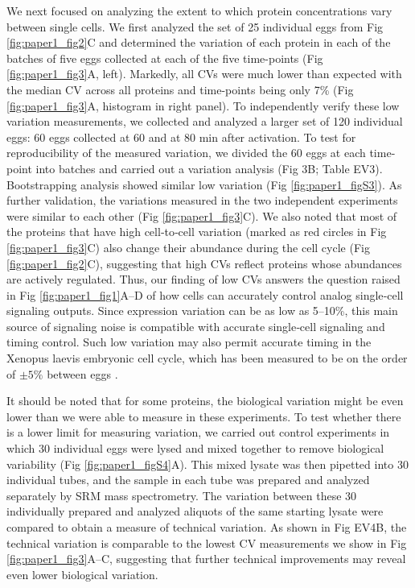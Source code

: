 We next focused on analyzing the extent to which protein concentrations vary between single cells. We first analyzed the set of 25 individual eggs from Fig \ref{fig:paper1_fig2}C and determined the variation of each protein in each of the batches of five eggs collected at each of the five time-points (Fig \ref{fig:paper1_fig3}A, left). Markedly, all CVs were much lower than expected with the median CV across all proteins and time-points being only 7\% (Fig \ref{fig:paper1_fig3}A, histogram in right panel). To independently verify these low variation measurements, we collected and analyzed a larger set of 120 individual eggs: 60 eggs collected at 60 and at 80 min after activation. To test for reproducibility of the measured variation, we divided the 60 eggs at each time-point into batches and carried out a variation analysis (Fig 3B; Table EV3). Bootstrapping analysis showed similar low variation (Fig \ref{fig:paper1_figS3}). As further validation, the variations measured in the two independent experiments were similar to each other (Fig \ref{fig:paper1_fig3}C). We also noted that most of the proteins that have high cell‐to‐cell variation (marked as red circles in Fig \ref{fig:paper1_fig3}C) also change their abundance during the cell cycle (Fig \ref{fig:paper1_fig2}C), suggesting that high CVs reflect proteins whose abundances are actively regulated. Thus, our finding of low CVs answers the question raised in Fig \ref{fig:paper1_fig1}A–D of how cells can accurately control analog single‐cell signaling outputs. Since expression variation can be as low as 5–10\%, this main source of signaling noise is compatible with accurate single‐cell signaling and timing control. Such low variation may also permit accurate timing in the Xenopus laevis embryonic cell cycle, which has been measured to be on the order of $\pm 5\%$ between eggs \cite{Tsai2014}.

It should be noted that for some proteins, the biological variation might be even lower than we were able to measure in these experiments. To test whether there is a lower limit for measuring variation, we carried out control experiments in which 30 individual eggs were lysed and mixed together to remove biological variability (Fig \ref{fig:paper1_figS4}A). This mixed lysate was then pipetted into 30 individual tubes, and the sample in each tube was prepared and analyzed separately by SRM mass spectrometry. The variation between these 30 individually prepared and analyzed aliquots of the same starting lysate were compared to obtain a measure of technical variation. As shown in Fig EV4B, the technical variation is comparable to the lowest CV measurements we show in Fig \ref{fig:paper1_fig3}A–C, suggesting that further technical improvements may reveal even lower biological variation.

